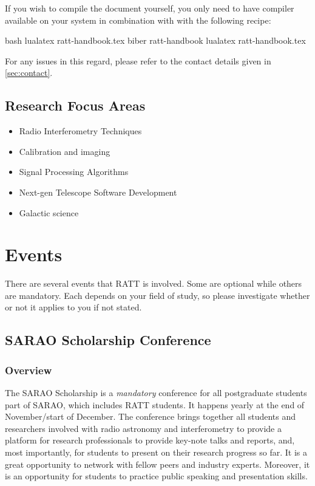         If you wish to compile the document yourself, you only need to have  compiler available on your system in combination with  with the following recipe:

        \begin{rattcode}{bash}
            lualatex ratt-handbook.tex
            biber ratt-handbook
            lualatex ratt-handbook.tex
        \end{rattcode}

        For any issues in this regard, please refer to the contact details given in \cref{sec:contact}.

    \subsection{Research Focus Areas}
        \begin{itemize}
            \item Radio Interferometry Techniques
            \item Calibration and imaging
            \item Signal Processing Algorithms
            \item Next-gen Telescope Software Development
            \item Galactic science
        \end{itemize}


\section{Events}\label{sec:2:events}
    There are several events that RATT is involved. Some are optional while others are mandatory. Each depends on your field of study, so please investigate whether or not it applies to you if not stated.

    \subsection{SARAO Scholarship Conference}\label{subsec:sarao_scholarship_conference}

    \subsubsection{Overview}\label{subsubsec:overview}
        The SARAO Scholarship is a \emph{mandatory} conference for all postgraduate students part of SARAO, which includes RATT students. It happens yearly at the end of November/start of December. The conference brings together all students and researchers involved with radio astronomy and interferometry to provide a platform for research professionals to provide key-note talks and reports, and, most importantly, for students to present on their research progress so far. It is a great opportunity to network with fellow peers and industry experts. Moreover, it is an opportunity for students to practice public speaking and presentation skills.

